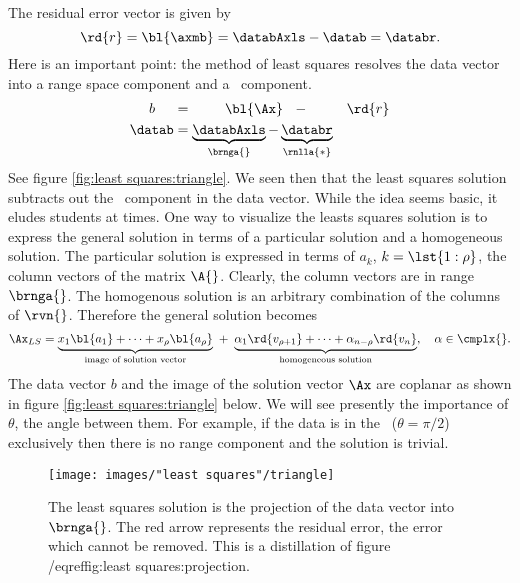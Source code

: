 The residual error vector is given by
\begin{equation}
  {\rd{ r }} = {\bl{ \axmb }} = \databAxls - \datab = \databr.
\end{equation}
Here is an important point: the method of least squares resolves the data vector into a range space component and a \ns \ component.
\begin{equation}
  \begin{split}
      b\quad\ &= \quad \ \quad  {\bl{ \Ax }} \    \  - \ \qquad \ {\rd{ r }} \\
    \datab &= \underbrace{\databAxls}_{\brnga{}} - \underbrace{\databr}_{\rnlla{*}}
  \end{split}
  \label{eq:least squares:svd:subtract}
\end{equation}
See figure \eqref{fig:least squares:triangle}.
We seen then that the least squares solution subtracts out the \ns \ component in the data vector. While the idea seems basic, it eludes students at times. One way to visualize the leasts squares solution is to express the general solution in terms of a particular solution and a homogeneous solution. The particular solution is expressed in terms of $a_{k}$, $k=\lst{1:\rho}$, the column vectors of the matrix $\A{}$. Clearly, the column vectors are in range $\brnga{}$. The homogenous solution is an arbitrary combination of the columns of $\rvn{}$. Therefore the general solution becomes
\begin{equation}
  \Ax_{LS} = \underbrace{x_{1} {\bl{ a_{1} }} + \dots + x_{\rho} {\bl{ a_{\rho} }}}_{\text{image of solution vector}}\ +\ \underbrace{\alpha_{1} {\rd{ v_{\rho+1} }} + \dots +  \alpha_{n-\rho} {\rd{ v_{n} }}}_{\text{homogeneous solution}}, \quad \alpha \in \cmplx{}.
\end{equation}
The data vector $b$ and the image of the solution vector $\Ax$ are coplanar as shown in figure \eqref{fig:least squares:triangle} below. We will see presently the importance of $\theta$, the angle between them. For example, if the data is in the \ns \ ($\theta = \pi/2$) exclusively then there is no range component and the solution is trivial. 


%
\begin{figure}[htbp] %
   \centering
   \texttt{[image: images/"least squares"/triangle]} 
   \caption[The least squares solution is the projection of the data vector into $\brnga{}$]{The least squares solution is the projection of the data vector into $\brnga{}$. The red arrow represents the residual error, the error which cannot be removed. This is a distillation of figure /eqref{fig:least squares:projection}.}
   \label{fig:least squares:triangle}
\end{figure}

